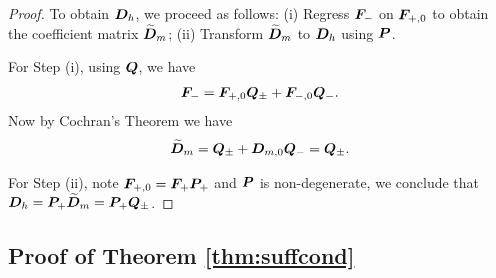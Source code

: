 \documentclass[12pt]{article}
\begin{document}
\begin{proof}
To obtain $\bD_h$, we proceed as follows: (i) Regress $\bF_-$ on $\bF_{+,0}$ to obtain the coefficient matrix $\tilde{\bD}_m$; (ii) Transform $\tilde{\bD}_m$ to $\bD_h$ using $\bP$.

For Step (i), using $\bQ$, we have
\begin{align*}
    \bF_- = \bF_{+,0}\bQ_{\pm} + \bF_{-,0}\bQ_{-}.
\end{align*}
Now by Cochran's Theorem we have 
\begin{align*}
    \tilde{\bD}_m = \bQ_{\pm} + \bD_{m,0} \bQ_{-} = \bQ_{\pm}.
\end{align*}

For Step (ii), note $\bF_{+,0} = \bF_+\bP_+$ and $\bP$ is non-degenerate, we conclude that $\bD_h = \bP_+\tilde{\bD}_m = \bP_+\bQ_{\pm}$.

\end{proof}

\subsection{Proof of Theorem \ref{thm:suffcond}}
\end{document}
